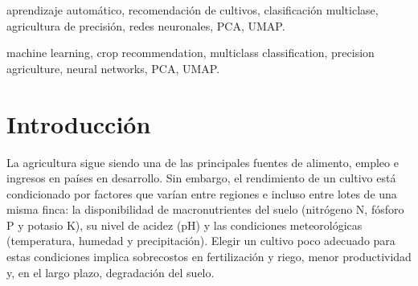 \documentclass[conference]{IEEEtran}
\begin{document}
\renewcommand{\IEEEkeywordsname}{Palabras clave}

\begin{IEEEkeywords}
aprendizaje automático, recomendación de cultivos, clasificación multiclase, agricultura de precisión, redes neuronales, PCA, UMAP.
\end{IEEEkeywords}

\begin{abstract}
The selection of the appropriate crop for a given plot of land depends on the interaction between the physicochemical properties of the soil and the climatic conditions of the area. When this decision is made solely based on experience or general criteria, it can lead to inaccurate recommendations, loss of resources, and low yields. In this project, a predictive system based on machine learning is developed to recommend the most suitable crop based on seven variables: nitrogen, phosphorus, potassium, temperature, relative humidity, pH, and precipitation. A public dataset of 2200 samples is used, distributed in a balanced manner across 22 crops, with no missing data or duplicate records. The problem is formulated as a supervised multiclass classification task. Exploratory analysis shows that potassium, humidity, and phosphorus are the variables with the greatest class separation capacity, and there is a strong correlation between phosphorus and potassium ($r=0.74$). Models from different families will be compared: logistic regression, K-nearest neighbors, Random Forest, artificial neural networks, and support vector machines, under stratified cross-validation using accuracy and macro F1 metrics. Furthermore, the effect of feature selection and dimensionality reduction through PCA and UMAP on predictive performance will be studied.
\end{abstract}

\renewcommand{\IEEEkeywordsname}{Index Terms}

\begin{IEEEkeywords}
machine learning, crop recommendation, multiclass classification, precision agriculture, neural networks, PCA, UMAP.
\end{IEEEkeywords}



\section{Introducción}


La agricultura sigue siendo una de las principales fuentes de alimento, empleo e ingresos en países en desarrollo. Sin embargo, el rendimiento de un cultivo está condicionado por factores que varían entre regiones e incluso entre lotes de una misma finca: la disponibilidad de macronutrientes del suelo (nitrógeno N, fósforo P y potasio K), su nivel de acidez (pH) y las condiciones meteorológicas (temperatura, humedad y precipitación). Elegir un cultivo poco adecuado para estas condiciones implica sobrecostos en fertilización y riego, menor productividad y, en el largo plazo, degradación del suelo.
\end{document}
